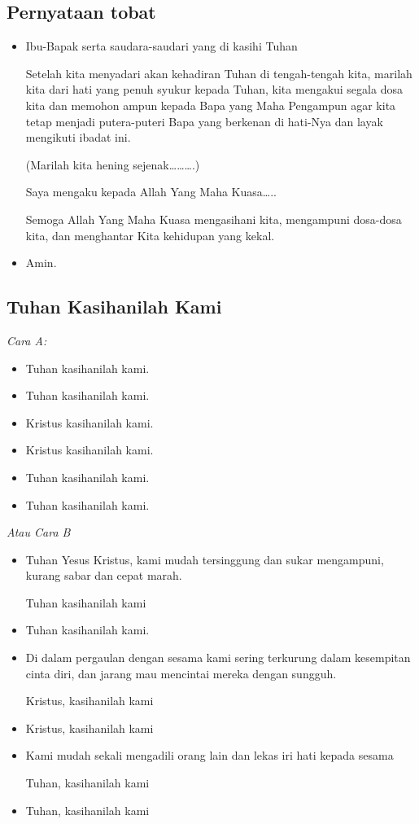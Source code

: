 \documentclass[a4paper,12pt]{article}
\newcommand{\BU}[1]{\begin{itemize} \item[U:] #1 \end{itemize}}
\newcommand{\BP}[1]{\begin{itemize} \item[P:] #1 \end{itemize}}
\begin{document}
\subsection*{Pernyataan tobat}

\BP{Ibu-Bapak serta saudara-saudari yang di kasihi Tuhan

Setelah kita menyadari akan kehadiran Tuhan di tengah-tengah kita, marilah kita dari hati yang penuh syukur kepada
Tuhan, kita mengakui segala dosa kita dan memohon ampun kepada Bapa yang Maha Pengampun agar kita tetap menjadi
putera-puteri Bapa yang berkenan di hati-Nya dan layak mengikuti ibadat ini.

(Marilah kita hening sejenak{\dots}{\dots}{\dots}.)

Saya mengaku kepada Allah Yang Maha Kuasa{\dots}..

Semoga Allah Yang Maha Kuasa mengasihani kita, mengampuni dosa-dosa kita, dan menghantar Kita kehidupan yang kekal.}

\BU{Amin.}

\subsection*{Tuhan Kasihanilah Kami}

\textit{Cara A:}
\BP{Tuhan kasihanilah kami.}

\BU{Tuhan kasihanilah kami.}

\BP{Kristus kasihanilah kami.}

\BU{Kristus kasihanilah kami.}

\BP{Tuhan kasihanilah kami.}

\BU{Tuhan kasihanilah kami.}

\textit{Atau Cara B}

\BP{Tuhan Yesus Kristus, kami mudah tersinggung dan sukar mengampuni, kurang sabar dan cepat marah.

Tuhan kasihanilah kami}

\BU{Tuhan kasihanilah kami.}


\BP{Di dalam pergaulan dengan sesama kami sering terkurung dalam kesempitan cinta diri, dan jarang mau mencintai mereka
dengan sungguh.

Kristus, kasihanilah kami}

\BU{Kristus, kasihanilah kami}

\BP{Kami mudah sekali mengadili orang lain dan lekas iri hati kepada sesama

Tuhan, kasihanilah kami}

\BU{Tuhan, kasihanilah kami}
\end{document}
